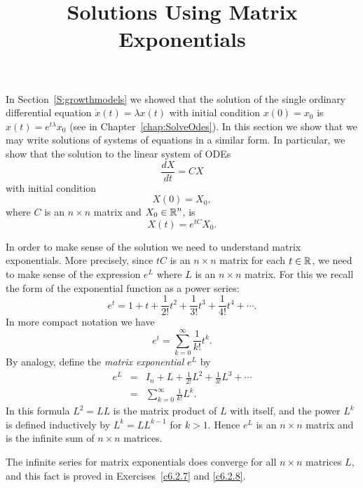 \documentclass{ximera}
\title{Solutions Using Matrix Exponentials}
\begin{document}
\begin{abstract}
\end{abstract}
\maketitle


\label{S:Matrixexp} 

In Section~\ref{S:growthmodels} we showed that the solution of the single
ordinary differential equation $\dot x(t) = \lambda x(t)$ with initial
condition $x(0)=x_0$ is $x(t) = e^{t\lambda}x_0$ (see  in
Chapter~\ref{chap:SolveOdes}).  In this section we show that we
may write solutions of systems of equations in a similar form.
In particular, we show that the solution to the linear system of ODEs
\begin{equation}   \label{eq:x=Mx}
\frac{dX}{dt} = CX
\end{equation}
with initial condition
\[
X(0) = X_0,
\]
where $C$ is an $n\times n$ matrix and $X_0\in\mbox{$\Bbb{R}$}^n$, is
\begin{equation}  \label{matrixsoln}
X(t) = e^{tC}X_0.
\end{equation}

In order to make sense of the solution  we need
to understand matrix exponentials. More precisely, since $tC$ is
an $n\times n$ matrix for each $t\in\mbox{$\Bbb{R}$}$, we need to make sense
of the expression $e^L$ where $L$ is an $n\times n$ matrix.  For
this we recall the form of the exponential function as a power
series:
\[
     e^t = 1 + t + \frac{1}{2!} t^2 + \frac{1}{3!} t^3
     + \frac{1}{4!} t^4 + \cdots .
\]
In more compact notation we have
\[
     e^t = \sum\limits_{k=0}^\infty \frac{1}{k!} t^k.
\]
By analogy, define the {\em matrix exponential\/}
$e^L$ by
\begin{eqnarray}
e^{L} & = & I_n + L + \frac{1}{2!} L^2 + \frac{1}{3!} L^3 +\cdots
\label{e:expL}\\
      & = & \sum\limits_{k=0}^\infty\frac{1}{k!} L^k. \nonumber
\end{eqnarray}
In this formula $L^2 = LL$ is the matrix product of $L$ with itself, and the
power $L^k$ is defined inductively by $L^k = LL^{k-1}$ for $k>1$.  Hence
$e^L$ is an $n\times n$ matrix and is the infinite sum of $n\times n$
matrices.

   The infinite series for matrix exponentials
 does converge for all $n\times n$ matrices $L$, and this fact
is proved in Exercises~\ref{c6.2.7} and \ref{c6.2.8}.
\end{document}
